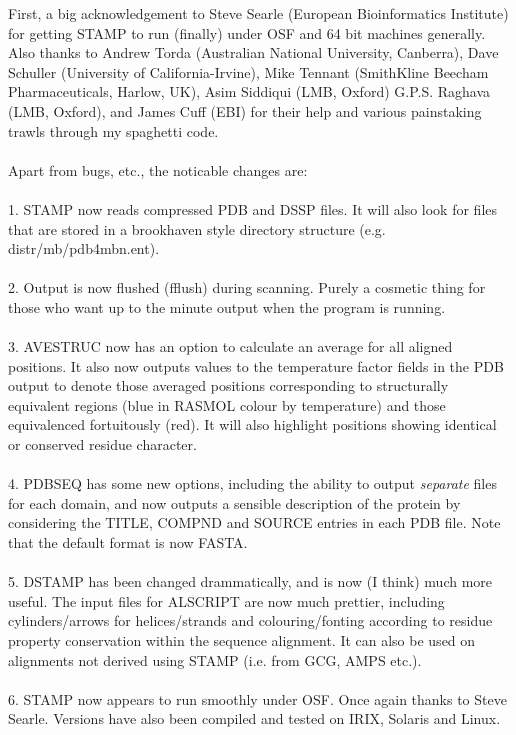 First, a big acknowledgement to Steve Searle (European Bioinformatics Institute)
for getting STAMP to run (finally) under OSF and 64 bit machines generally.
Also thanks to Andrew Torda 
(Australian National University, Canberra), Dave Schuller (University of California-Irvine),
Mike Tennant (SmithKline Beecham Pharmaceuticals, Harlow, UK),
Asim Siddiqui (LMB, Oxford) G.P.S. Raghava (LMB, Oxford), and James Cuff (EBI)
for their help and various painstaking trawls through my spaghetti code.\\
\\
Apart from bugs, etc., the noticable changes are:\\
\\
1. STAMP now reads compressed PDB and DSSP files.  It will also look for files that
are stored in a brookhaven style directory structure (e.g. distr/mb/pdb4mbn.ent).\\
\\
2. Output is now flushed (fflush) during scanning.  Purely a cosmetic thing for those who
want up to the minute output when the program is running.\\
\\
3. AVESTRUC now has an option to calculate an average for all aligned positions.  It also
now outputs values to the temperature factor fields in the PDB output to denote those
averaged positions corresponding to structurally equivalent regions (blue in RASMOL 
colour by temperature) and those equivalenced fortuitously (red).  It will also highlight
positions showing identical or conserved residue character.\\
\\
4. PDBSEQ has some new options, including the ability to output {\em separate} files
for each domain, and now outputs a sensible description of the protein by
considering the TITLE, COMPND and SOURCE entries in each PDB file.  Note that the
default format is now FASTA.\\
\\
5. DSTAMP has been changed drammatically, and is now (I think) much more useful.  The
input files for ALSCRIPT are now much prettier, including cylinders/arrows for helices/strands 
and colouring/fonting according to residue property conservation within the sequence alignment.
It can also be used on alignments not derived using STAMP (i.e. from GCG, AMPS etc.).\\
\\
6. STAMP now appears to run smoothly under OSF.  Once again thanks to Steve Searle.  Versions
have also been compiled and tested on IRIX, Solaris and Linux.\\
